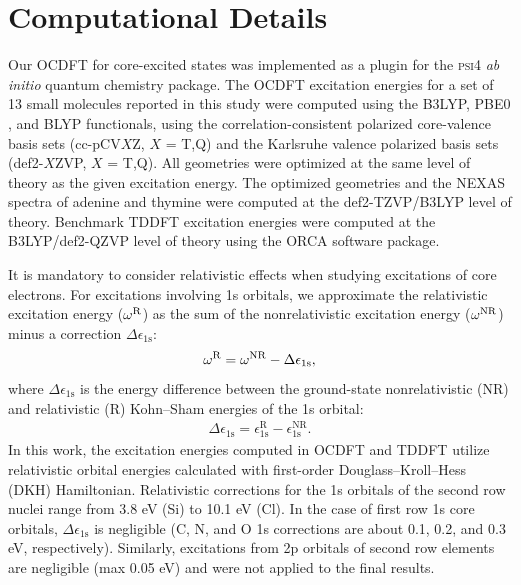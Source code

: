 \documentclass[12pt]{article}
\begin{document}
\section{Computational Details}
Our OCDFT for core-excited states was implemented as a plugin for the \textsc{psi4} \textit{ab initio} quantum chemistry package.\cite{turney_psi4:_2012}
The OCDFT excitation energies for a set of 13 small molecules reported in this study were computed using the B3LYP, \cite{becke_new_1993,lee_development_1988,vosko_accurate_1980,stephens_ab_1994} PBE0 \cite{adamo_toward_1999}, and BLYP\cite{stephens_ab_1994,miehlich_results_1989} functionals, using the correlation-consistent polarized core-valence basis sets (cc-pCV$X$Z, $X$ = T,Q)\cite{woon_gaussian_1995-1}
and the Karlsruhe valence polarized basis sets (def2-$X$ZVP, $X$ = T,Q).\cite{weigend_balanced_2005,weigend_accurate_2006} All geometries were optimized at the same level of theory as the given excitation energy.
The optimized geometries and the NEXAS spectra of adenine and thymine were computed at the def2-TZVP/B3LYP level of theory. 
Benchmark TDDFT excitation energies were computed at the B3LYP/def2-QZVP level of theory using the ORCA software package.\cite{neese_orca_2012}

It is mandatory to consider relativistic effects when studying excitations of core electrons.\cite{maganas_l-edge_2014,debeer_george_calibration_2010,bauer_herfd-xas_2014,ankudinov_sensitivity_2002}
For excitations involving 1s orbitals, we approximate the relativistic excitation energy ($\omega^{\rm R}$) as the sum of the nonrelativistic excitation energy ($ \omega^{\rm NR}$) minus a correction $\Delta\epsilon_{\text{1s}}$:
\begin{align}
\omega^{\rm R} = \omega^{\rm NR} - \Delta\epsilon_{\text{1s}} ,
\end{align}
where $\Delta\epsilon_{\text{1s}}$ is the energy difference between the ground-state nonrelativistic (NR) and relativistic (R) Kohn--Sham energies of the 1s orbital:
\begin{align}
\Delta\epsilon_{\text{1s}} = \epsilon_{\text{1s}}^{\text{R}} - \epsilon_{\text{1s}}^{\text{NR}}.
\end{align}
In this work, the excitation energies computed in OCDFT and TDDFT utilize relativistic orbital energies calculated with first-order Douglass--Kroll--Hess (DKH) Hamiltonian.\cite{douglas_quantum_1973,hess_applicability_1985, hess_relativistic_1986} 
Relativistic corrections for the 1s orbitals of the second row nuclei range from 3.8 eV (Si) to 10.1 eV (Cl). 
In the case of first row 1s core orbitals, $\Delta\epsilon_{\text{1s}}$ is negligible (C, N, and O 1s corrections are about 0.1, 0.2, and 0.3 eV, respectively).  Similarly, excitations from 2p orbitals of second row elements are negligible (max 0.05 eV) and were not applied to the final results.
\end{document}
